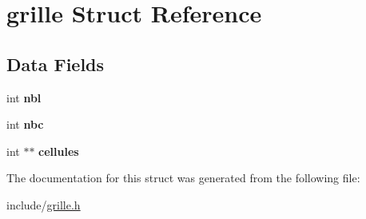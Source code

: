 \hypertarget{structgrille}{}\section{grille Struct Reference}
\label{structgrille}
\subsection*{Data Fields}
\begin{DoxyCompactItemize}
\item 
\mbox{\label{structgrille_a0b4da1e205825df205b0c004d105d62a}} 
int {\bfseries nbl}
\item 
\mbox{\label{structgrille_a48d6706d41bee6fff9200d872b8b0cd0}} 
int {\bfseries nbc}
\item 
\mbox{\label{structgrille_a428cf0c0297ce04e0206ba0067ac3b42}} 
int $\ast$$\ast$ {\bfseries cellules}
\end{DoxyCompactItemize}


The documentation for this struct was generated from the following file\+:\begin{DoxyCompactItemize}
\item 
include/\hyperlink{grille_8h}{grille.\+h}\end{DoxyCompactItemize}
